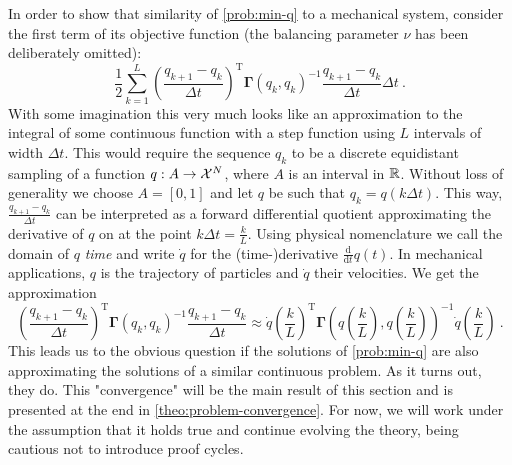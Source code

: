 In order to show that similarity of \cref{prob:min-q} to a mechanical system, consider the first term of its objective function (the balancing parameter $\nu$ has been deliberately omitted):
\begin{equation}
	\label{eq:discrete-lagrangian}
	\frac{1}{2} \sum_{k=1}^{L} \left(\frac{q_{k+1} - q_k}{\Delta t}\right)^\mathrm{T} \mathbf{\Gamma}(q_k, q_k)^{-1} \frac{q_{k+1} - q_k}{\Delta t} \Delta t \ .
\end{equation}
With some imagination this very much looks like an approximation to the integral of some continuous function with a step function using $L$ intervals of width $\Delta t$.
This would require the sequence $q_k$ to be a discrete equidistant sampling of a function $q: A \rightarrow \mathcal{X}^N$, where $A$ is an interval in $\mathbb{R}$.
Without loss of generality we choose $A = [0, 1]$ and let $q$ be such that $q_k = q(k \Delta t)$.
This way, $\frac{q_{k+1} - q_k}{\Delta t}$ can be interpreted as a forward differential quotient approximating the derivative of $q$ on at the point $k \Delta t = \frac{k}{L}$.
Using physical nomenclature we call the domain of $q$ \emph{time} and write $\dot{q}$ for the (time-)derivative $\frac{\mathrm{d}}{\mathrm{d}t}q(t)$.
In mechanical applications, $q$ is the trajectory of particles and $\dot{q}$ their velocities.
We get the approximation
\begin{equation}
	\left(\frac{q_{k+1} - q_k}{\Delta t}\right)^\mathrm{T} \mathbf{\Gamma}(q_k, q_k)^{-1} \frac{q_{k+1} - q_k}{\Delta t} 
	\approx \dot{q}\left(\frac{k}{L}\right)^\mathrm{T} \mathbf{\Gamma}\left(q\left(\frac{k}{L}\right), q\left(\frac{k}{L}\right)\right)^{-1}\dot{q}\left(\frac{k}{L}\right) \ .
\end{equation}
This leads us to the obvious question if the solutions of \cref{prob:min-q} are also approximating the solutions of a similar continuous problem.
As it turns out, they do.
This "convergence" will be the main result of this section and is presented at the end in \cref{theo:problem-convergence}.
For now, we will work under the assumption that it holds true and continue evolving the theory, being cautious not to introduce proof cycles.

